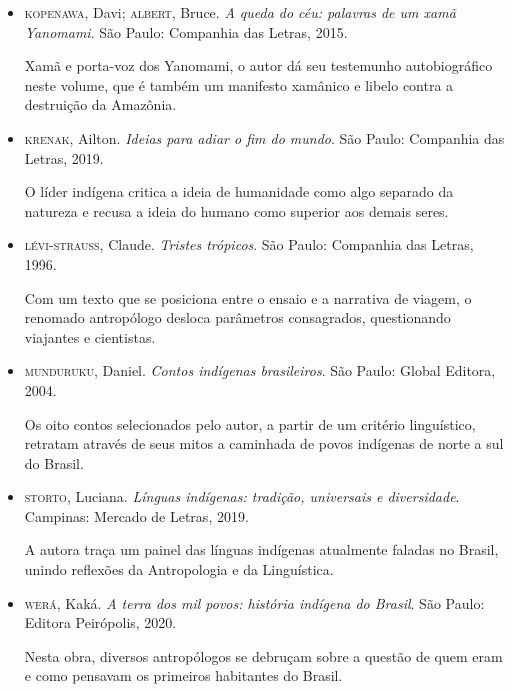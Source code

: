 \documentclass[11pt]{extarticle}
\begin{document}
\begin{itemize}
\item \textsc{kopenawa}, Davi; \textsc{albert}, Bruce. \textit{A queda do céu: palavras de um
xamã Yanomami}. São Paulo: Companhia das Letras, 2015.

Xamã e porta-voz dos Yanomami, o autor dá seu testemunho autobiográfico neste volume, que é também um manifesto xamânico e libelo contra a destruição da Amazônia.

\item \textsc{krenak}, Ailton. \textit{Ideias para adiar o fim do mundo}. São Paulo:
Companhia das Letras, 2019.

O líder indígena critica a ideia de humanidade como algo separado da natureza e recusa a ideia do humano como superior aos demais seres.

\item \textsc{lévi-strauss}, Claude. \textit{Tristes trópicos}. São Paulo: Companhia das
Letras, 1996.

Com um texto que se posiciona entre o ensaio e a narrativa de viagem, o renomado antropólogo desloca parâmetros consagrados, questionando viajantes e cientistas.

\item \textsc{munduruku}, Daniel. \textit{Contos indígenas brasileiros}. São Paulo:
Global Editora, 2004.

Os oito contos selecionados pelo autor, a partir de um critério linguístico, retratam através de seus mitos a caminhada de povos
indígenas de norte a sul do Brasil.

\item \textsc{storto}, Luciana. \textit{Línguas indígenas: tradição, universais e
diversidade}. Campinas: Mercado de Letras, 2019.

A autora traça um painel das línguas indígenas atualmente faladas no Brasil, unindo reflexões da Antropologia e da Linguística.

\item \textsc{werá}, Kaká. \textit{A terra dos mil povos: história indígena do Brasil}.
São Paulo: Editora Peirópolis, 2020.

Nesta obra, diversos antropólogos se debruçam sobre a questão de quem eram e como pensavam os primeiros habitantes do Brasil.

\end{itemize}
\end{document}

